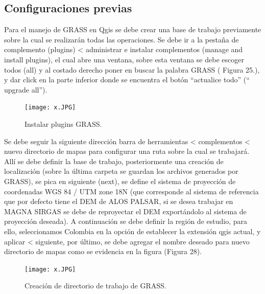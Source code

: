 \documentclass[12pt,hidelinks]{article}
\begin{document}
\subsection{Configuraciones previas}
Para el manejo de GRASS en Qgis se debe crear una base de trabajo previamente sobre la cual se realizarán todas las operaciones. Se debe ir a la pestaña de complemento (plugins) < administrar e instalar complementos (manage and install plugins), el cual abre una ventana, sobre esta ventana se debe escoger todos (all) y al costado derecho poner en buscar la palabra GRASS ( Figura 25.), y dar click en la parte inferior donde se encuentra el botón “actualice todo” (“ upgrade all”).
\begin{figure}[H]
    \centering
    \texttt{[image: x.JPG]}
    \caption{Instalar plugins GRASS.}
    \label{fig:my_label}
\end{figure}
Se debe seguir la siguiente dirección barra de herramientas < complementos < nuevo directorio de mapas para configurar una ruta sobre la cual se trabajará. Allí se debe definir la base de trabajo, posteriormente una creación de localización (sobre la última carpeta se guardan los archivos generados por GRASS), se pica en siguiente (next), se define el sistema de proyección de coordenadas WGS 84 / UTM zone 18N (que corresponde al sistema de referencia que por defecto tiene el DEM de ALOS PALSAR, si se desea trabajar en MAGNA SIRGAS se debe de reproyectar el DEM exportándolo al sistema de proyección deseada). A continuación se debe definir la región de estudio, para ello, seleccionamos Colombia en la opción de establecer la extensión qgis actual, y aplicar < siguiente, por último, se debe agregar el nombre deseado para nuevo directorio de mapas como se evidencia en la figura (Figura 28).

\begin{figure}[H]
    \centering
    \texttt{[image: x.JPG]}
    \caption{Creación de directorio de trabajo de GRASS.}
    \label{fig:my_label}
\end{figure}
\end{document}
